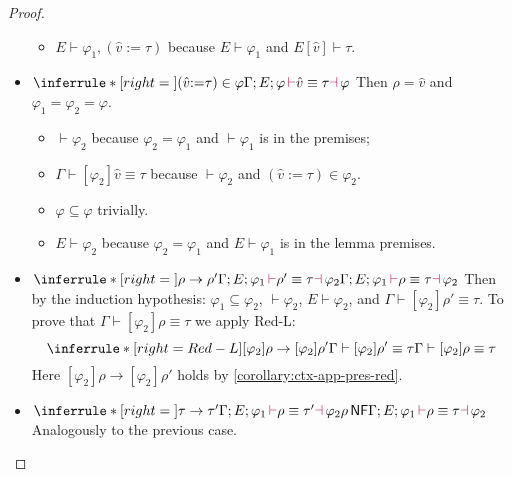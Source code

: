 \documentclass[a4,natbib=false]{article}
\newcommand{\ctxtapp}[2]{[{#1}] {#2}}
\newcommand{\evarassign}[2]{({#1} \mathsf{:=} {#2})}
\newcommand{\reduces}[2]{{#1} \rightarrow {#2}}
\newcommand{\judgectx}[2]{{#1} \vdash {#2}}
\newcommand{\judgesafeinenv}[2]{{#1}  \vdash {#2}}
\newcommand{\judgesafeinenvv}[3]{{#1}[{#2}]  \vdash {#3}}
\newcommand{\judgeequivuntg}[3]{{#1} \vdash {#2} \equiv {#3}}
\newcommand{\judgeunify}[4]{{#1}\,{\color{purple}\vdash} {#2} \equiv {#3} {\color{purple}\dashv}\,{#4}}
\newcommand{\judgeSnf}[1]{{#1}\,\mathsf{NF}}
\newcommand{\Infer}[3]{\inferrule*[right={#1}]{#2}{#3}}
\begin{document}
\begin{proof}
\begin{itemize}
\begin{itemize}
        \item $\judgesafeinenv{E}{\varphi_1, \evarassign{\hat{v}}{\tau}}$
          because $\judgesafeinenv{E}{\varphi_1}$ and $\judgesafeinenvv{E}{\hat{v}}{\tau}$.
     \end{itemize}
   \item 
      $
      \Infer{}
      { 
        \evarassign{\hat{v}}{\tau} \in \varphi
      }
      {
        \judgeunify{\Gamma; E; \varphi}{\hat{v}}{\tau}{\varphi}
      }
      $
      Then $\rho = \hat{v}$ and $\varphi_1 = \varphi_2 = \varphi$.
      \begin{itemize}
      \item $\judgectx{}{\varphi_2}$ because $\varphi_2 = \varphi_1$ and
        $\judgectx{}{\varphi_1}$ is in the premises;
      \item $\judgeequivuntg{\Gamma}{\ctxtapp{\varphi_2}{\hat{v}}}{\tau}$ because
        $\judgectx{}{\varphi_2}$ and $\evarassign{\hat{v}}{\tau} \in \varphi_2$.
      \item $\varphi \subseteq \varphi$ trivially.
      \item $\judgesafeinenv{E}{\varphi_2}$ because $\varphi_2 = \varphi_1$ and
        $\judgesafeinenv{E}{\varphi_1}$ is in the lemma premises.
      \end{itemize}
    \item
      $
      \Infer{}
      {
        \reduces{\rho}{\rho'}\\
        \judgeunify{\Gamma; E; \varphi_1}{\rho'}{\tau}{\varphi_2}
      }
      {
        \judgeunify{\Gamma; E; \varphi_1}{\rho}{\tau}{\varphi_2}
      }
      $
      Then by the induction hypothesis:
      $\varphi_1 \subseteq \varphi_2$,
      $\judgectx{}{\varphi_2}$,
      $\judgesafeinenv{E}{\varphi_2}$,
      and $\judgeequivuntg{\Gamma}{\ctxtapp{\varphi_2}{\rho'}}{\tau}$.
      To prove that $\judgeequivuntg{\Gamma}{\ctxtapp{\varphi_2}{\rho}}{\tau}$ we apply Red-L:
      $$
      \Infer{Red-L}
      {
        \reduces{\ctxtapp{\varphi_2}{\rho}}{\ctxtapp{\varphi_2}{\rho'}}\\
        \judgeequivuntg{\Gamma}{\ctxtapp{\varphi_2}{\rho'}}{\tau}
      }
      {
        \judgeequivuntg{\Gamma}{\ctxtapp{\varphi_2}{\rho}}{\tau}
      }
      $$
      Here $\reduces{\ctxtapp{\varphi_2}{\rho}}{\ctxtapp{\varphi_2}{\rho'}}$
      holds by \cref{corollary:ctx-app-pres-red}.
    \item
      $
      \Infer{}
      {
        \reduces{\tau}{\tau'}\\
        \judgeunify{\Gamma; E; \varphi_1}{\rho}{\tau'}{\varphi_2}\\
        \judgeSnf{\rho}
      }
      {
        \judgeunify{\Gamma; E; \varphi_1}{\rho}{\tau}{\varphi_2}
      }
      $
      Analogously to the previous case.


\end{itemize}
\end{proof}
\end{document}
